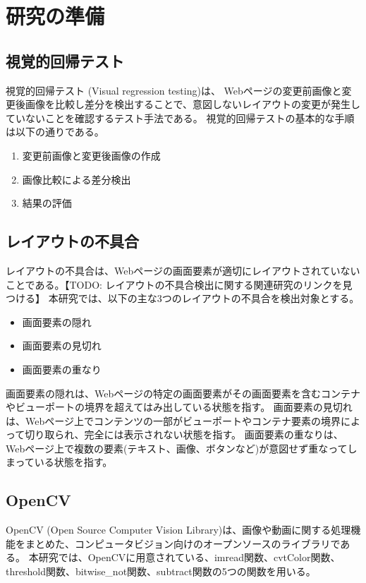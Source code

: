 \chapter{研究の準備}\label{cha:Preparation}

\section{視覚的回帰テスト}\label{sec:vrt}
視覚的回帰テスト (Visual regression testing)\cite{Visual regression testing}は、
Webページの変更前画像と変更後画像を比較し差分を検出することで、意図しないレイアウトの変更が発生していないことを確認するテスト手法である。
視覚的回帰テストの基本的な手順は以下の通りである。
\begin{enumerate}
    \setlength{\itemsep}{0pt}
          \setlength{\parsep}{0pt}
    \item 変更前画像と変更後画像の作成
    \item 画像比較による差分検出
    \item 結果の評価
\end{enumerate}

\section{レイアウトの不具合}\label{sec:layout effect}
レイアウトの不具合は、Webページの画面要素が適切にレイアウトされていないことである。【TODO: レイアウトの不具合検出に関する関連研究のリンクを見つける】
本研究では、以下の主な3つのレイアウトの不具合を検出対象とする。
\begin{itemize}
    \setlength{\itemsep}{0pt}
          \setlength{\parsep}{0pt}
    \item 画面要素の隠れ
    \item 画面要素の見切れ
    \item 画面要素の重なり
\end{itemize}
画面要素の隠れは、Webページの特定の画面要素がその画面要素を含むコンテナやビューポートの境界を超えてはみ出している状態を指す。
画面要素の見切れは、Webページ上でコンテンツの一部がビューポートやコンテナ要素の境界によって切り取られ、完全には表示されない状態を指す。
画面要素の重なりは、Webページ上で複数の要素(テキスト、画像、ボタンなど)が意図せず重なってしまっている状態を指す。

\section{OpenCV}\label{sec:opencv}
OpenCV (Open Source Computer Vision Library)は、画像や動画に関する処理機能をまとめた、コンピュータビジョン向けのオープンソースのライブラリである\cite{OpenCV}。
本研究では、OpenCVに用意されている、imread関数、cvtColor関数、threshold関数、bitwise\_not関数、subtract関数の5つの関数を用いる。
